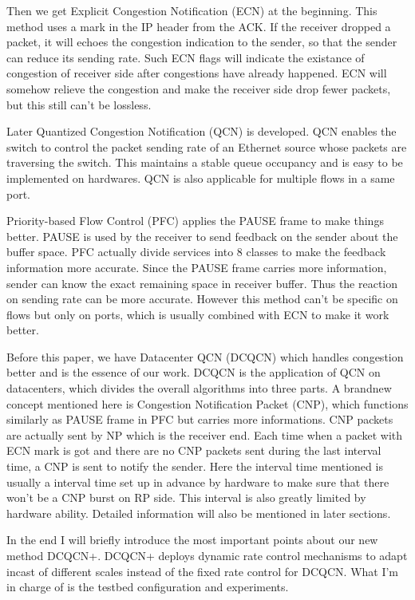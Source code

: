 \documentclass[12pt,a4paper]{article}
\begin{document}
Then we get Explicit Congestion Notification (ECN) at the beginning.
This method uses a mark in the IP header from the ACK.
If the receiver dropped a packet, it will echoes the congestion indication to the sender, so that the sender can reduce its sending rate.
Such ECN flags will indicate the existance of congestion of receiver side after congestions have already happened.
ECN will somehow relieve the congestion and make the receiver side drop fewer packets, but this still can't be lossless.

Later Quantized Congestion Notification (QCN) is developed.
QCN enables the switch to control the packet sending rate of an Ethernet source whose packets are traversing the switch.
This maintains a stable queue occupancy and is easy to be implemented on hardwares.
QCN is also applicable for multiple flows in a same port.

Priority-based Flow Control (PFC) applies the PAUSE frame to make things better.
PAUSE is used by the receiver to send feedback on the sender about the buffer space.
PFC actually divide services into 8 classes to make the feedback information more accurate.
Since the PAUSE frame carries more information, sender can know the exact remaining space in receiver buffer.
Thus the reaction on sending rate can be more accurate.
However this method can't be specific on flows but only on ports, which is usually combined with ECN to make it work better.

Before this paper, we have Datacenter QCN (DCQCN) which handles congestion better and is the essence of our work.
DCQCN is the application of QCN on datacenters, which divides the overall algorithms into three parts.
A brandnew concept mentioned here is Congestion Notification Packet (CNP), which functions similarly as PAUSE frame in PFC but carries more informations.
CNP packets are actually sent by NP which is the receiver end.
Each time when a packet with ECN mark is got and there are no CNP packets sent during the last interval time, a CNP is sent to notify the
sender.
Here the interval time mentioned is usually a interval time set up in advance by hardware to make sure that there won't be a CNP burst on
RP side.
This interval is also greatly limited by hardware ability.
Detailed information will also be mentioned in later sections.

In the end I will briefly introduce the most important points about our new method DCQCN+.
DCQCN+ deploys dynamic rate control mechanisms to adapt incast of different scales instead of the fixed rate control for DCQCN.
What I'm in charge of is the testbed configuration and experiments.
\end{document}
